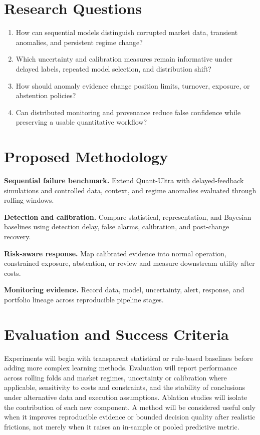 \documentclass[11pt]{article}
\begin{document}
\section*{Research Questions}
\begin{enumerate}
\item How can sequential models distinguish corrupted market data, transient anomalies, and persistent regime change?
\item Which uncertainty and calibration measures remain informative under delayed labels, repeated model selection, and distribution shift?
\item How should anomaly evidence change position limits, turnover, exposure, or abstention policies?
\item Can distributed monitoring and provenance reduce false confidence while preserving a usable quantitative workflow?
\end{enumerate}

\section*{Proposed Methodology}
\textbf{Sequential failure benchmark.} Extend Quant-Ultra with delayed-feedback simulations and controlled data, context, and regime anomalies evaluated through rolling windows.

\textbf{Detection and calibration.} Compare statistical, representation, and Bayesian baselines using detection delay, false alarms, calibration, and post-change recovery.

\textbf{Risk-aware response.} Map calibrated evidence into normal operation, constrained exposure, abstention, or review and measure downstream utility after costs.

\textbf{Monitoring evidence.} Record data, model, uncertainty, alert, response, and portfolio lineage across reproducible pipeline stages.

\section*{Evaluation and Success Criteria}
Experiments will begin with transparent statistical or rule-based baselines before adding more complex learning methods. Evaluation will report performance across rolling folds and market regimes, uncertainty or calibration where applicable, sensitivity to costs and constraints, and the stability of conclusions under alternative data and execution assumptions. Ablation studies will isolate the contribution of each new component. A method will be considered useful only when it improves reproducible evidence or bounded decision quality after realistic frictions, not merely when it raises an in-sample or pooled predictive metric.
\end{document}
